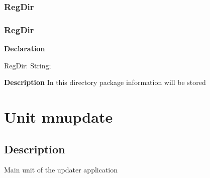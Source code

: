 \documentclass{report}
\newif\ifpdf
\begin{document}
\subsection*{\large{\textbf{RegDir}}\normalsize\hspace{1ex}\hrulefill}
\else
\subsection*{RegDir}
\fi
\label{manager-RegDir}
\begin{list}{}{
\setlength{\itemindent}{0cm}
\setlength{\listparindent}{0cm}
\setlength{\leftmargin}{\evensidemargin}
\addtolength{\leftmargin}{\tmplength}
\settowidth{\labelsep}{X}
\addtolength{\leftmargin}{\labelsep}
\setlength{\labelwidth}{\tmplength}
}
\item[\textbf{Declaration}\hfill]
\ifpdf
\begin{flushleft}
\fi
\begin{ttfamily}
RegDir: String;\end{ttfamily}

\ifpdf
\end{flushleft}
\fi

\par
\item[\textbf{Description}]
In this directory package information will be stored

\end{list}
\chapter{Unit mnupdate}
\label{mnupdate}
\section{Description}
Main unit of the updater application
\end{document}
